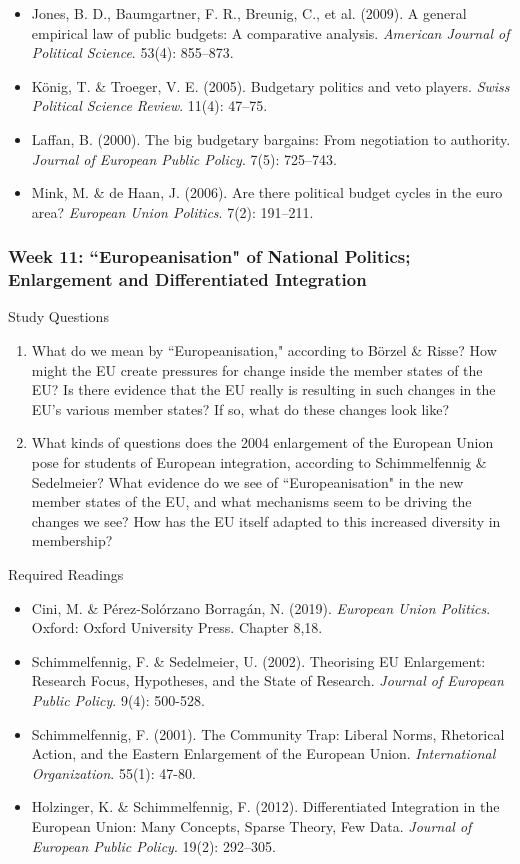 \begin{itemize}
	\item Jones, B. D., Baumgartner, F. R., Breunig, C., et al. (2009). A general empirical law of public budgets: A comparative analysis. \textit{American Journal of Political Science}. 53(4): 855–873.
	\item K{\"o}nig, T. \& Troeger, V. E. (2005). Budgetary politics and veto players. \textit{Swiss Political Science Review}. 11(4): 47–75.
	\item Laffan, B. (2000). The big budgetary bargains: From negotiation to authority. \textit{Journal of European Public Policy}. 7(5): 725–743.
	\item Mink, M. \& de Haan, J. (2006). Are there political budget cycles in the euro area? \textit{European Union Politics}. 7(2): 191–211.
\end{itemize}


\subsubsection*{Week 11: ``Europeanisation" of National Politics; Enlargement and Differentiated Integration}

Study Questions

\begin{enumerate}
	\item What do we mean by ``Europeanisation," according to B\"{o}rzel \& Risse? How might the EU create pressures for change inside the member states of the EU? Is there evidence that the EU really is resulting in such changes in the EU’s various member states? If so, what do these changes look like?

	\item What kinds of questions does the 2004 enlargement of the European Union pose for students of European integration, according to Schimmelfennig \& Sedelmeier? What evidence do we see of ``Europeanisation" in the new member states of the EU, and what mechanisms seem to be driving the changes we see? How has the EU itself adapted to this increased diversity in membership?
\end{enumerate}

\noindent Required Readings

\begin{itemize}
	\item Cini, M. \& P\'{e}rez-Sol\'{o}rzano Borrag\'{a}n, N. (2019). \textit{European Union Politics}. Oxford: Oxford University Press. Chapter 8,18.
	\item Schimmelfennig, F. \& Sedelmeier, U. (2002). Theorising EU Enlargement: Research Focus, Hypotheses, and the State of Research. \textit{Journal of European Public Policy}. 9(4): 500-528.
	\item Schimmelfennig, F. (2001). The Community Trap: Liberal Norms, Rhetorical Action, and the Eastern Enlargement of the European Union. \textit{International Organization}. 55(1): 47-80.
	\item Holzinger, K. \& Schimmelfennig, F. (2012). Differentiated Integration in the European Union: Many Concepts, Sparse Theory, Few Data. \textit{Journal of European Public Policy}. 19(2): 292–305.
\end{itemize}

